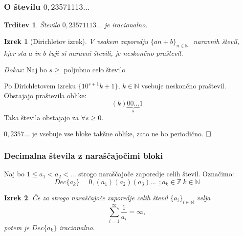 \documentclass{beamer}
\def\N{\mathbb{N}} %
\def\Z{\mathbb{Z}} %
\def\qed{$\hfill\Box$}   %
\newtheorem{izrek}{Izrek}
\newtheorem{trditev}{Trditev}
\begin{document}
\begin{frame}
    \frametitle{O številu $0,23571113\dots$}
    \begin{trditev}
        Število $0,23571113 \dots$ je iracionalno.
    \end{trditev}

    \pause
    \begin{izrek}[Dirichletov izrek]
        \label{Dirichletov izrek}
        V vsakem zaporedju $ \lbrace an + b \rbrace_{n \in \N_0}$ naravnih števil, kjer sta $a$ in $b$
        tuji si naravni števili, je neskončno praštevil.
    \end{izrek}
    \pause
    \emph{Dokaz:} Naj bo $s \geq$ poljubno celo število
    
    Po Dirichletovem izreku $ \{10^{s+1}k + 1\}$, $k \in \N$ vsebuje neskončno praštevil.
    \pause
    Obstajajo praštevila oblike:
    \[(k)\underbrace{00 \dots}_{s}1\]
    \pause
    Taka števila obstajajo za $\forall s \geq 0$.
    
    $0,2357\dots$ je vsebuje vse bloke takšne oblike, zato ne bo periodično.
    \qed

\end{frame}


\begin{frame}
    \frametitle{Decimalna števila z naraščajočimi bloki}

    Naj bo $1 \leq a_1 < a_2 < \dots $ strogo naraščajoče zaporedje celih števil. 
    Označimo: \[Dec\{a_k\} = 0,(a_1)(a_2)(a_3)... \  \ ;  a_k \in \Z \ k \in \N \]
    \pause


    \begin{izrek}\label{izrek1clanek1}
        Če za strogo naraščajoče zaporedje celih števil $\{a_i\}_{i \in \N}$ velja 
        \[ \sum_{i=1}^{\infty} \frac{1}{a_i} = \infty ,\]
        potem je $Dec\{a_k\}$ iracionalno.
    \end{izrek}

\end{frame}
\end{document}
